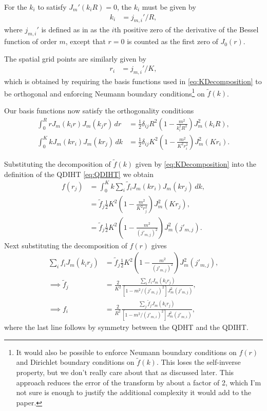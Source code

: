 \documentclass[aip,amsmath,amssymb,reprint,twocolumn]{revtex4-1}
\begin{document}
For the $k_i$ to satisfy $J_m'(k_i R) = 0$, the $k_i$ must be given by
\begin{align}
  k_i &= j_{m,i}'/R,
\end{align}
where $j_{m,i}'$ is defined as in \citet{Abramowitz:1972} as the $i$th positive zero of the derivative of the Bessel function of order $m$, except that $r=0$ is counted as the first zero of $J_0(r)$.

The spatial grid points are similarly given by
\begin{align}
  r_i &= j_{m,i}'/K,
\end{align}
which is obtained by requiring the basis functions used in \eqref{eq:KDecomposition} to be orthogonal and enforcing Neumann boundary conditions\footnote{It would also be possible to enforce Neumann boundary conditions on $f(r)$ and Dirichlet boundary conditions on $\tilde{f}(k)$.  This loses the self-inverse property, but we don't really care about that as discussed later.  This approach reduces the error of the transform by about a factor of 2, which I'm not sure is enough to justify the additional complexity it would add to the paper.} on $\tilde{f}(k)$.  

Our basis functions now satisfy the orthogonality conditions
\begin{align}
  \int_0^R r J_m(k_i r) J_m(k_j r)\, dr &= \frac{1}{2} \delta_{ij} R^2 \left(1 - \frac{m^2}{k_i^2 R^2}\right) J_m^2(k_i R), \label{eq:DiscreteROrthogonalityCondition}\\
  \int_0^K k J_m(k r_i) J_m(k r_j)\, dk &= \frac{1}{2} \delta_{ij} K^2 \left(1 - \frac{m^2}{K^2 r_i^2}\right) J_m^2(K r_i). \label{eq:DiscreteKOrthogonalityCondition}
\end{align}

Substituting the decomposition of $\tilde{f}(k)$ given by \eqref{eq:KDecomposition} into the definition of the QDIHT \eqref{eq:QDIHT} we obtain
\begin{align}
  f(r_j) &= \int_0^K k \sum_i \tilde{f}_i J_m(k r_i) J_m(k r_j)\, dk, \\
  &= \tilde{f}_j \frac{1}{2}K^2  \left(1 - \frac{m^2}{K^2 r_j^2}\right) J_m^2(K r_j), \\
  &= \tilde{f}_j \frac{1}{2}K^2  \left(1 - \frac{m^2}{(j'_{m,j})^2}\right) J_m^2(j'_{m,j}).
\end{align}
Next substituting the decomposition of $f(r)$ gives
\begin{align}
  \sum_i f_i J_m(k_i r_j) &= \tilde{f}_j \frac{1}{2} K^2 \left(1 - \frac{m^2}{(j'_{m,j})^2}\right) J_m^2(j'_{m,j}), \\
  \implies \tilde{f}_j &= \frac{2}{K^2} \frac{\sum_i f_i J_m(k_i r_j)}{\left[1-m^2/(j'_{m,j})^2\right] J_m^2(j'_{m,j})} , \\
  \implies f_i &= \frac{2}{R^2} \frac{\sum_j \tilde{f}_j J_m(k_i r_j)}{\left[1-m^2/(j'_{m,i})^2\right] J_m^2(j'_{m,i})} ,
\end{align}
where the last line follows by symmetry between the QDHT and the QDIHT.
\end{document}
